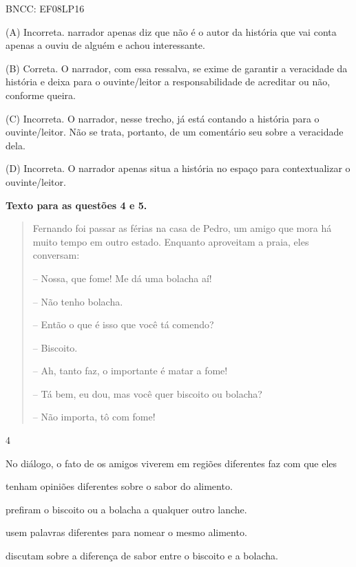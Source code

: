 BNCC: EF08LP16

(A) Incorreta. narrador apenas diz que não é o autor da história que
vai conta apenas a ouviu de alguém e achou interessante.

(B) Correta. O narrador, com essa ressalva, se exime de
garantir a
veracidade da história e deixa para o ouvinte/leitor a responsabilidade
de acreditar ou não, conforme queira.

(C) Incorreta. O narrador, nesse trecho, já está contando a história
para o ouvinte/leitor. Não se trata, portanto, de um comentário seu
sobre a veracidade dela.

(D) Incorreta. O narrador apenas situa a história no espaço para
contextualizar o ouvinte/leitor.

\textbf{Texto para as questões 4 e 5.}

\begin{quote}
Fernando foi passar as férias na casa de Pedro, um amigo que mora há
muito tempo em outro
estado. Enquanto aproveitam a praia, eles conversam:

-- Nossa, que fome! Me dá uma bolacha aí!

-- Não tenho bolacha.

-- Então o que é isso que você tá comendo?

-- Biscoito.

-- Ah, tanto faz, o importante é matar a fome!

-- Tá bem, eu dou, mas você quer biscoito ou bolacha?

-- Não importa, tô com fome!
\end{quote}


\num{4}

No diálogo, o fato de os amigos viverem em regiões diferentes faz com
que eles

\begin{escolha}
\item tenham opiniões diferentes sobre o sabor do alimento.

\item prefiram o biscoito ou a bolacha a qualquer outro lanche.

\item usem palavras diferentes para nomear o mesmo alimento.

\item discutam sobre a diferença de sabor entre o biscoito e a bolacha.
\end{escolha}

